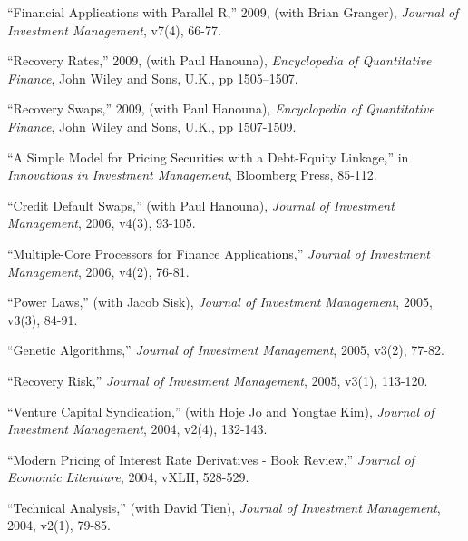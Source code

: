 \documentclass{article}
\begin{document}
\begin{etaremune}
\item ``Financial Applications with Parallel R,'' 2009, (with Brian Granger), {\it Journal of Investment Management}, v7(4), 66-77. 	

\item ``Recovery Rates,'' 2009, (with Paul Hanouna),
{\it Encyclopedia of Quantitative Finance}, John Wiley and Sons, U.K., pp 1505--1507.  

\item ``Recovery Swaps,'' 2009, (with Paul Hanouna), 
{\it Encyclopedia of Quantitative Finance}, John Wiley and Sons, U.K., pp 1507-1509.  

\item ``A Simple Model for Pricing Securities with a Debt-Equity Linkage,'' in 
{\it Innovations in Investment Management}, Bloomberg Press, 85-112.


\item ``Credit Default Swaps,'' (with Paul Hanouna),  
{\it Journal of Investment Management}, 2006, v4(3), 93-105. 

\item ``Multiple-Core Processors for Finance Applications,'' 
{\it Journal of Investment Management}, 2006, v4(2), 76-81.

\item ``Power Laws,'' (with Jacob Sisk), 
{\it Journal of Investment Management}, 2005, v3(3), 84-91. 

\item ``Genetic Algorithms,'' 
{\it Journal of Investment Management}, 2005, v3(2), 77-82.

\item ``Recovery Risk,''
{\it Journal of Investment Management}, 2005, v3(1), 113-120. 

\item ``Venture Capital Syndication,'' (with Hoje Jo and Yongtae Kim), 
{\it Journal of Investment Management}, 2004, v2(4), 132-143. 

\item ``Modern Pricing of Interest Rate Derivatives - Book Review,''
{\it Journal of Economic Literature}, 2004, vXLII, 528-529.

\item ``Technical Analysis,'' (with David Tien),
{\it Journal of Investment Management}, 2004, v2(1), 79-85.


\end{etaremune}
\end{document}

